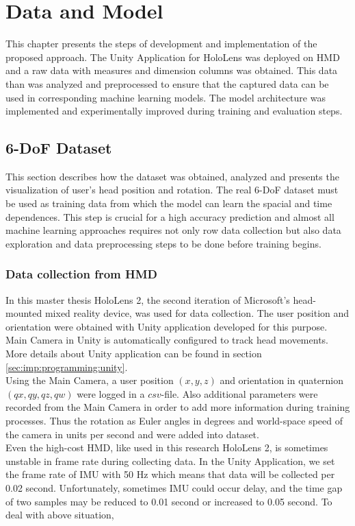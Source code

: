 \chapter{Data and Model}
\label{sec:design}
This chapter presents the steps of development and implementation of the proposed approach. The Unity Application for HoloLens was deployed on HMD and a raw data with measures and dimension columns was obtained. This data than was analyzed and preprocessed to ensure that the captured data can be used in corresponding machine learning models. The model architecture was implemented and experimentally improved during training and evaluation steps. 

\section{6-DoF Dataset}
\label{sec:design:dataset}
This section describes how the dataset was obtained, analyzed and presents the visualization of user's head position and rotation. The real 6-DoF dataset must be used as training data from which the model can learn the spacial and time dependences. This step is crucial for a high accuracy prediction and almost all machine learning approaches requires not only row data collection but also data exploration and data preprocessing steps to be done before training begins.

\subsection{Data collection from HMD}
\label{sec:design:dataset:HL}
In this master thesis HoloLens 2, the second iteration of Microsoft's head-mounted mixed reality device, was used for data collection. The user position and orientation were obtained with Unity application developed for this purpose. Main Camera in Unity is automatically configured to track head movements. More details about Unity application can be found in section \ref{sec:imp:programming:unity}.\\
Using the Main Camera, a user position $(x, y, z)$ and orientation in quaternion $(qx, qy, qz, qw)$ were logged in a $csv$-file. Also additional parameters were recorded from the Main Camera in order to add more information during training processes. Thus the rotation as Euler angles in degrees and world-space speed of the camera in units per second and were added into dataset.\\
Even the high-cost HMD, like used in this research HoloLens 2, is sometimes unstable in frame rate during collecting data. In the Unity Application, we set the frame rate of IMU with 50 Hz which means that data will be collected per 0.02 second. Unfortunately, sometimes IMU could occur delay, and the time gap of two samples may be reduced to 0.01 second or increased to 0.05 second. To deal with above situation,

